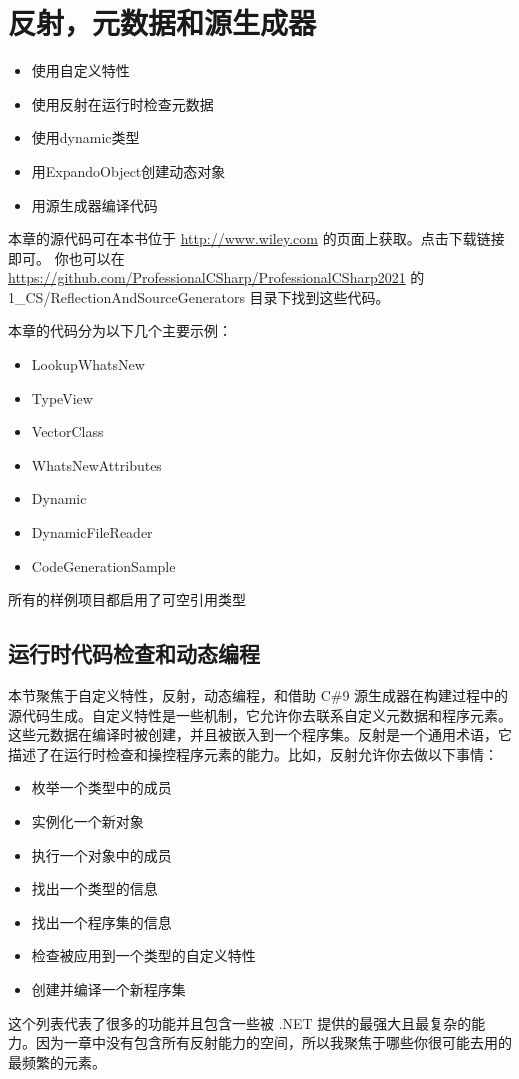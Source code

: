 \chapter{反射，元数据和源生成器}
\underline{}
\begin{itemize}
    \item 使用自定义特性
    \item 使用反射在运行时检查元数据
    \item 使用dynamic类型
    \item 用ExpandoObject创建动态对象
    \item 用源生成器编译代码
\end{itemize}

\underline{}

本章的源代码可在本书位于 \url{http://www.wiley.com} 的页面上获取。点击下载链接即可。
你也可以在 \url{https://github.com/ProfessionalCSharp/ProfessionalCSharp2021} 的 1\_CS/ReflectionAndSourceGenerators 目录下找到这些代码。

本章的代码分为以下几个主要示例：
\begin{itemize}
    \item LookupWhatsNew
    \item TypeView
    \item VectorClass
    \item WhatsNewAttributes
    \item Dynamic
    \item DynamicFileReader
    \item CodeGenerationSample
\end{itemize}
所有的样例项目都启用了可空引用类型

\section{运行时代码检查和动态编程}
本节聚焦于自定义特性，反射，动态编程，和借助 C\#9 源生成器在构建过程中的源代码生成。自定义特性是一些机制，它允许你去联系自定义元数据和程序元素。这些元数据在编译时被创建，并且被嵌入到一个程序集。反射是一个通用术语，它描述了在运行时检查和操控程序元素的能力。比如，反射允许你去做以下事情：
\begin{itemize}
    \item 枚举一个类型中的成员
    \item 实例化一个新对象
    \item 执行一个对象中的成员
    \item 找出一个类型的信息
    \item 找出一个程序集的信息
    \item 检查被应用到一个类型的自定义特性
    \item 创建并编译一个新程序集
\end{itemize}
这个列表代表了很多的功能并且包含一些被 .NET 提供的最强大且最复杂的能力。因为一章中没有包含所有反射能力的空间，所以我聚焦于哪些你很可能去用的最频繁的元素。


